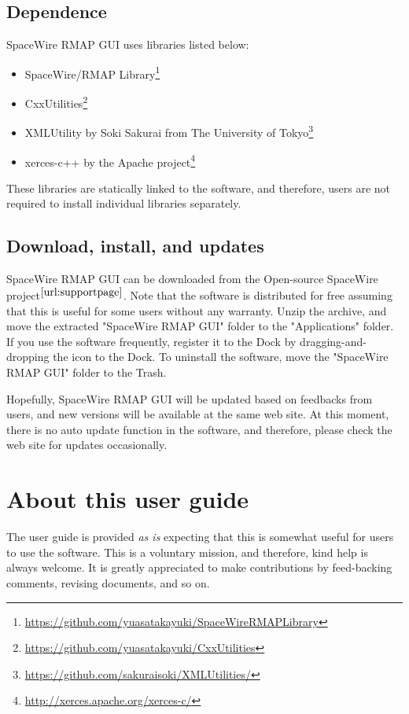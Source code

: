 \documentclass[a4paper,10pt]{article}
\begin{document}
\subsection{Dependence}
SpaceWire RMAP GUI uses libraries listed below:
\begin{itemize}
  \setlength{\parskip}{0cm}
  \setlength{\itemsep}{0cm}
\item SpaceWire/RMAP Library\footnote{\url{https://github.com/yuasatakayuki/SpaceWireRMAPLibrary}}
\item CxxUtilities\footnote{\url{https://github.com/yuasatakayuki/CxxUtilities}}
\item XMLUtility by Soki Sakurai from The University of Tokyo\footnote{\url{https://github.com/sakuraisoki/XMLUtilities/}}
\item xerces-c++ by the Apache project\footnote{\url{http://xerces.apache.org/xerces-c/}}
\end{itemize}
These libraries are statically linked to the software, and therefore, users are not required to install individual libraries separately.

\subsection{Download, install, and updates}
SpaceWire RMAP GUI can be downloaded from the Open-source SpaceWire project$^\mathrm{\ref{url:supportpage}}$.
Note that the software is distributed for free assuming that this is useful for some users without any warranty.
Unzip the archive, and move the extracted "SpaceWire RMAP GUI" folder to the "Applications" folder.
If you use the software frequently, register it to the Dock by dragging-and-dropping the icon to the Dock. To uninstall the software, move the "SpaceWire RMAP GUI" folder to the Trash.

Hopefully, SpaceWire RMAP GUI will be updated based on feedbacks from users, and new versions will be available at the same web site. At this moment, there is no auto update function in the software, and therefore, please check the web site for updates occasionally.


\section{About this user guide}
The user guide is provided {\it as is} expecting that this is somewhat useful for users to use the software. This is a voluntary mission, and therefore, kind help is always welcome. It is greatly appreciated to make contributions by feed-backing comments, revising documents, and so on.
\end{document}
